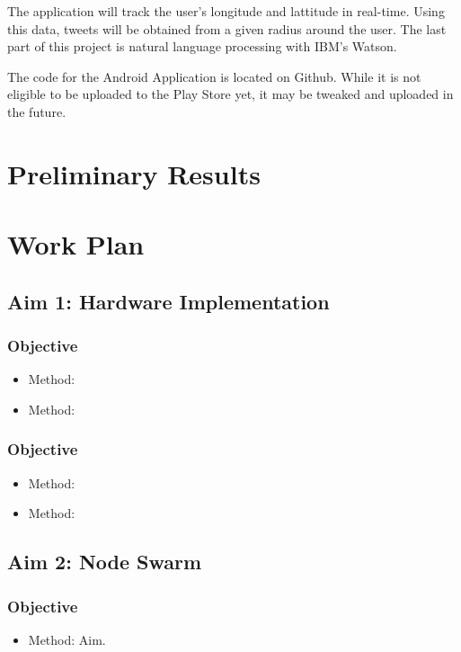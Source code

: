 \documentclass[12pt, oneside]{article}
\begin{document}
The application will track the user's longitude and lattitude in real-time. Using this data, tweets will be obtained from a given radius around the user. The last part of this project is natural language processing with IBM's Watson. 

The code for the Android Application is located on Github. While it is not
eligible to be uploaded to the Play Store yet, it may be tweaked and uploaded
in the future\cite{Git}.

\section{Preliminary Results}

\section{Work Plan}


\subsection{Aim 1: Hardware Implementation}

\subsubsection{Objective}

\begin{itemize}
 \item Method:
 \item Method:
\end{itemize}

\subsubsection{Objective}

\begin{itemize}
 \item Method:
 \item Method:
\end{itemize}

\subsection{Aim 2: Node Swarm}

\subsubsection{Objective}
\begin{itemize}
 \item Method:
 Aim.
\end{itemize}
\end{document}
